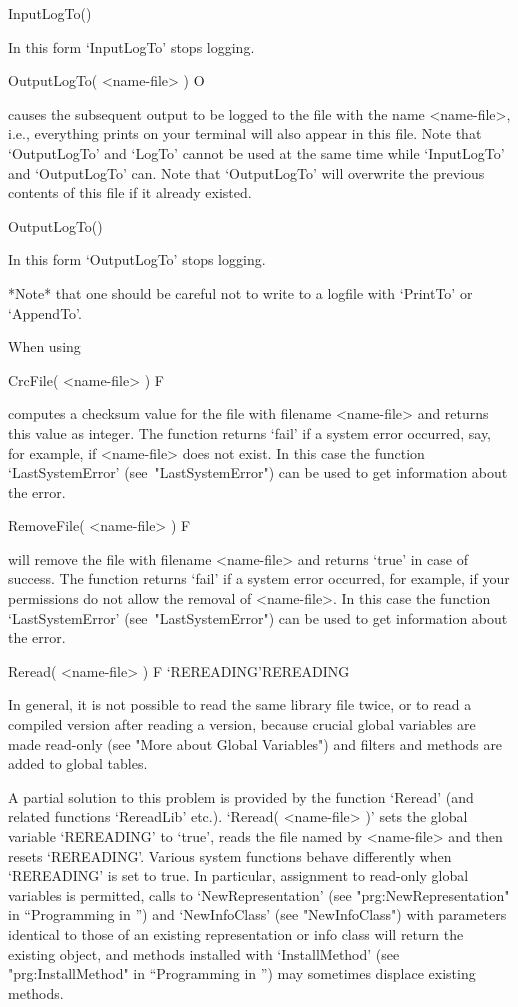 \)InputLogTo()

In this form `InputLogTo' stops logging.

\>OutputLogTo( <name-file> ) O

causes   the subsequent output to   be logged to  the file  with the name
<name-file>,  i.e., everything {\GAP} prints  on  your terminal will also
appear in this file.  Note that  `OutputLogTo' and `LogTo' cannot be used
at the same time while `InputLogTo' and `OutputLogTo' can.
Note  that   `OutputLogTo'  will overwrite the   previous
contents of this file if it already existed.

\)OutputLogTo()

In this form `OutputLogTo' stops logging.

*Note* that one should be careful not to write to a logfile with
`PrintTo' or `AppendTo'.

When using 

\>CrcFile( <name-file> ) F

computes  a checksum  value for the  file  with filename <name-file>  and
returns this value  as integer. The function returns  `fail' if a  system
error occurred, say, for example, if <name-file> does not exist.
In this case the function `LastSystemError' (see~"LastSystemError")
can be used to get information about the error.

\>RemoveFile( <name-file> ) F

will remove the file with filename <name-file> and returns `true' in case
of  success.  The function returns `fail' if a system error occurred, for
example, if your permissions do not allow the removal of <name-file>.
In this case the function `LastSystemError' (see~"LastSystemError")
can be used to get information about the error.

\>Reread( <name-file> ) F
\>`REREADING'{REREADING}

In general, it is not possible to read the same {\GAP} library file
twice, or to read a compiled version after reading a {\GAP} version,
because crucial global variables are made read-only (see "More about
Global Variables") and filters and methods are added to global tables.

A partial solution to this problem is provided by the function
`Reread' (and related functions `RereadLib' etc.).  `Reread(
<name-file> )' sets the global variable `REREADING' to `true', reads
the file named by <name-file> and then resets `REREADING'. Various
system functions behave differently when `REREADING' is set to
true. In particular, assignment to read-only global variables is
permitted, calls to `NewRepresentation' (see "prg:NewRepresentation"
in ``Programming in {\GAP}'') and
`NewInfoClass' (see "NewInfoClass") with parameters identical to those
of an existing representation or info class will return the existing
object, and methods installed with `InstallMethod' (see
"prg:InstallMethod" in ``Programming in {\GAP}'') may sometimes displace
existing methods.

